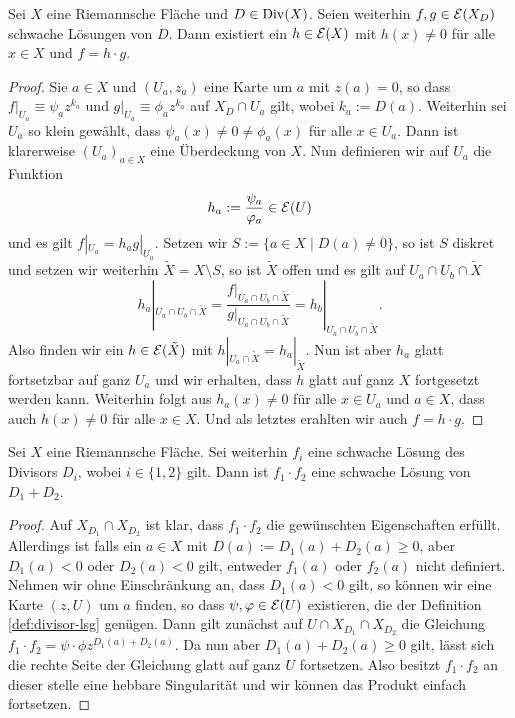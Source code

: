\begin{lemma}
  Sei $X$ eine Riemannsche Fläche und $D \in \operatorname{Div}(X)$. Seien weiterhin
  $f,g \in \mathcal{E}(X_D)$ schwache Lösungen von $D$. Dann existiert ein
  $h \in \mathcal{E}(X)$ mit $h(x) \neq 0$ für alle $x \in X$ und $ f
  = h\cdot g$.
\end{lemma}

\begin{proof}
  Sie $a \in X$ und $(U_a, z_a)$ eine Karte um $a$ mit $z(a) = 0$, so
  dass $f|_{U_a} \equiv \psi_a z^{k_a}$ und $g|_{U_a} \equiv \phi_a
  z^{k_a}$ auf $X_D \cap U_a$ gilt, wobei $k_a := D(a)$. Weiterhin sei
  $U_a$ so klein gewählt, dass $\psi_a(x) \neq 0 \neq \phi_a(x)$ für
  alle $x \in U_a$. Dann ist klarerweise $(U_a)_{a \in X}$ eine
  Überdeckung von $X$. Nun definieren wir auf $U_a$ die Funktion
  \[
  h_a := \frac{\psi_a}{\varphi_a} \in \mathcal{E}(U)
  \]
  und es gilt $f|_{U_a} = h_a g|_{U_a}$. Setzen wir $S := \{ a \in X
  \mid D(a) \neq 0\}$, so ist $S$ diskret und setzen wir weiterhin
  $\tilde X = X \setminus S$, so ist $\tilde X$ offen und es gilt auf $U_a \cap U_b \cap
  \tilde X$
  \[
  h_a|_{U_a \cap U_b \cap \tilde X} = \frac{f|_{U_a \cap U_b \cap
      \tilde X}}{g|_{U_a \cap U_b \cap \tilde X}} = h_b|_{U_a \cap U_b
    \cap \tilde X}.
  \]
  Also finden wir ein $h \in \mathcal{E}(\tilde X)$ mit $h|_{U_a \cap \tilde
    X} = h_a|_{\tilde X}$. Nun ist aber $h_a$ glatt fortsetzbar auf
  ganz $U_a$ und wir erhalten, dass $h$ glatt auf ganz $X$ fortgesetzt
  werden kann. Weiterhin folgt aus $h_a(x) \neq 0$ für alle $x \in
  U_a$ und $a \in X$, dass auch $h(x) \neq 0$ für alle $x \in X$. Und
  als letztes erahlten wir auch $f = h \cdot g$.
\end{proof}

\begin{lemma}
  \label{lemma:lsg-produkt}
  Sei $X$ eine Riemannsche Fläche. Sei weiterhin $f_i$ 
  eine schwache Lösung des Divisors $D_i$, wobei $i \in \{1,2\}$ gilt. Dann ist
  $f_1 \cdot f_2$ eine schwache Lösung von $D_1 + D_2$.
\end{lemma}

\begin{proof}
  Auf $X_{D_1} \cap X_{D_2}$ ist klar, dass $f_1 \cdot f_2$ die
  gewünschten Eigenschaften erfüllt. Allerdings ist falls ein $a \in
  X$ mit $D(a) := D_1(a) +
  D_2(a) \geq 0$, aber $D_1(a) < 0$ oder $D_2(a) < 0$ gilt, entweder $f_1(a)$ oder
  $f_2(a)$ nicht definiert. Nehmen wir ohne Einschränkung an, dass
  $D_1(a) < 0$ gilt, so können wir eine Karte $(z,U)$ um $a$ finden,
  so dass $\psi, \varphi \in \mathcal{E}(U)$ existieren, die der Definition
  \ref{def:divisor-lsg} genügen. Dann gilt zunächst auf $U \cap
  X_{D_1} \cap X_{D_2}$ die Gleichung $f_1 \cdot f_2 = \psi \cdot \phi
  z^{D_1(a) + D_2(a)}$. Da nun aber $D_1(a) + D_2(a) \geq 0$ gilt,
  lässt sich die rechte Seite der Gleichung glatt auf ganz $U$
  fortsetzen. Also besitzt $f_1 \cdot f_2$ an dieser stelle eine
  hebbare Singularität und wir können das Produkt einfach fortsetzen.
\end{proof}

